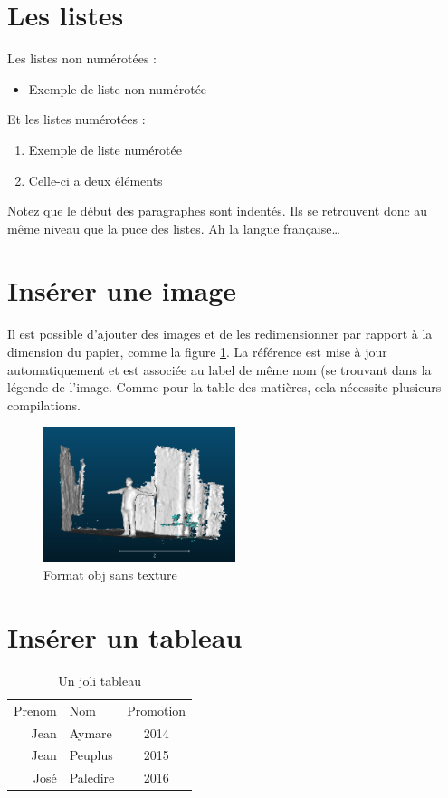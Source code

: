 \documentclass[10pt,a4paper]{report} %
\begin{document}
\section{Les listes}
Les listes non numérotées : 
\begin{itemize}
	\item Exemple de liste non numérotée
\end{itemize}

Et les listes numérotées : 
\begin{enumerate}
	\item Exemple de liste numérotée
	\item Celle-ci a deux éléments
\end{enumerate}
Notez que le début des paragraphes sont indentés. Ils se retrouvent donc au même \og{}niveau\fg{} que la puce des listes. Ah la langue française\dots
\section{Insérer une image}
Il est possible d'ajouter des images et de les redimensionner par rapport à la dimension du papier, comme la figure \ref{format}.
La référence est mise à jour automatiquement et est associée au label de même nom (se trouvant dans la légende de l'image. Comme pour la table des matières, cela nécessite plusieurs compilations.
\begin{figure}[!ht]
	\begin{center}
		\includegraphics[width=0.50\textwidth, keepaspectratio]{images/format.png}
		\caption{Format obj sans texture \label{format}}
	\end{center}
\end{figure}
  
\section{Insérer un tableau}
\begin{table}[!ht]
	\begin{center}
		\begin{tabular}{rl|c}
			Prenom & Nom      & Promotion \\
			Jean   & Aymare   & 2014      \\
			Jean   & Peuplus  & 2015      \\
			José  & Paledire & 2016      \\
		\end{tabular}
		\caption{Un joli tableau \label{tableau}}
	\end{center}
\end{table}
\end{document}
